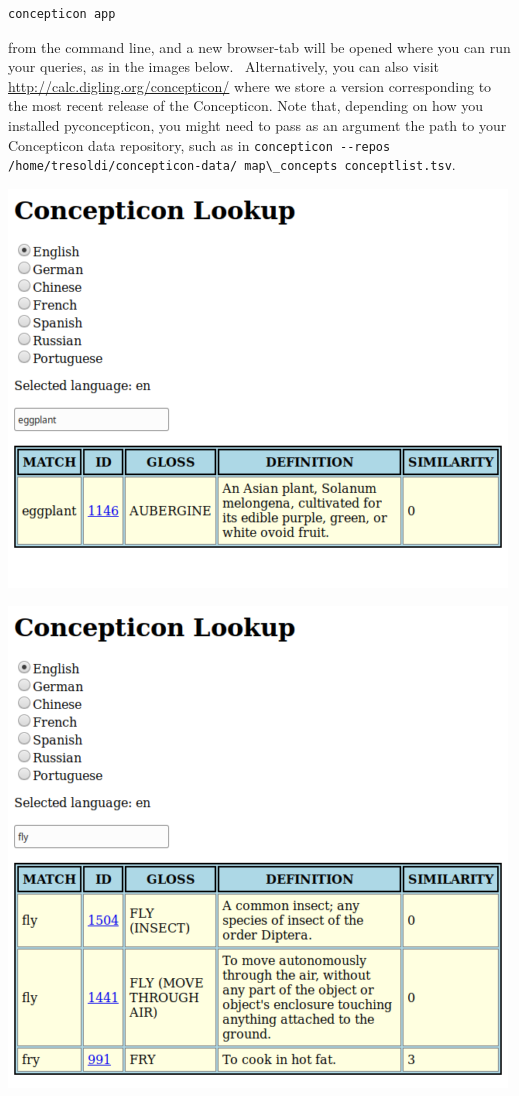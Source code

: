 \documentclass[
  a4paper,
  14pt,
  oneside,
  tablecaptionabove
]{scrbook}
\newcommand{\passthrough}[1]{#1}
\begin{document}
\begin{lstlisting}
concepticon app
\end{lstlisting}

from the command line, and a new browser-tab will be opened where you
can run your queries, as in the images below.~ Alternatively, you can
also visit \url{http://calc.digling.org/concepticon/} where we store a
version corresponding to the most recent release of the Concepticon.
Note that, depending on how you installed pyconcepticon, you might need
to pass as an argument the path to your Concepticon data repository,
such as in
\passthrough{\lstinline!concepticon --repos /home/tresoldi/concepticon-data/ map\_concepts conceptlist.tsv!}.

\includegraphics[width=5.20833in,height=4.15625in]{images/__f-origin.hypotheses.org_wp-content_blogs.dir_4500_files_2019_03_Screenshot_2019-03-26-Concepticon-Lookup-eggplant-500x399.png}

\includegraphics[width=5.20833in,height=5.02083in]{images/__f-origin.hypotheses.org_wp-content_blogs.dir_4500_files_2019_03_Screenshot_2019-03-26-Concepticon-Lookup-fly-500x482.png}
\end{document}
